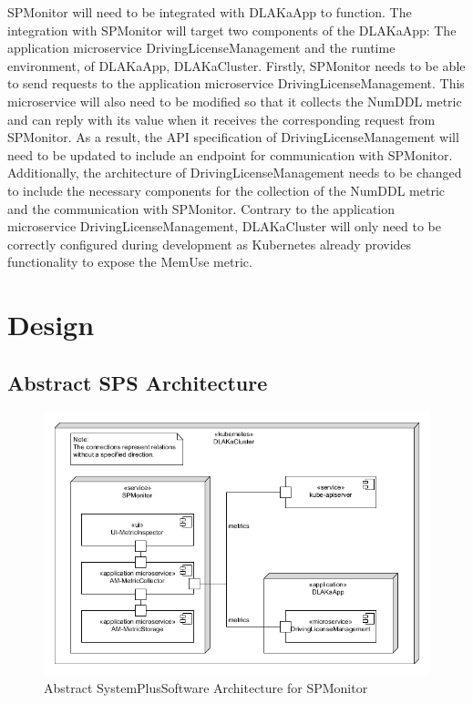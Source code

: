 
SPMonitor will need to be integrated with DLAKaApp to function.
The integration with SPMonitor will target two components of the DLAKaApp:
The application microservice DrivingLicenseManagement and the runtime environment, of DLAKaApp, DLAKaCluster.
Firstly, SPMonitor needs to be able to send requests to the application microservice DrivingLicenseManagement.
This microservice will also need to be modified so that it collects the NumDDL metric and can reply
with its value when it receives the corresponding request from SPMonitor.
As a result, the API specification of DrivingLicenseManagement will need to be updated to include
an endpoint for communication with SPMonitor. Additionally, the architecture of DrivingLicenseManagement
needs to be changed to include the necessary components for the collection of the NumDDL metric
and the communication with SPMonitor.
Contrary to the application microservice DrivingLicenseManagement, DLAKaCluster will only
need to be correctly configured during development as Kubernetes already provides functionality
to expose the MemUse metric.

\section{Design}
\label{sec:design}


\subsection{Abstract SPS Architecture}


\begin{figure}[h]
	\centering
	\includegraphics[width=\textwidth]{figures/abstract_sps_spmonitor.png}
	\caption{Abstract SystemPlusSoftware Architecture for SPMonitor}
	\label{fig:abstract_sps_spmonitor}
\end{figure}

